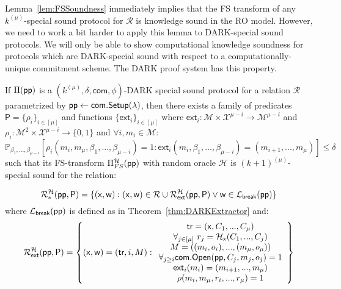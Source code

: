 Lemma~\ref{lem:FSSoundness} immediately implies that the FS transform of any $k^{(\mu)}$-special sound protocol for $\mathcal{R}$ is knowledge sound in the RO model. However, we need to work a bit harder to apply this lemma to DARK-special sound protocols. We will only be able to show computational knowledge soundness for protocols which are DARK-special sound with respect to a computationally-unique commitment scheme. The DARK proof system has this property. 
\begin{lemma} \label{lem:RODARKSpecial}
If $\Pi(\textsf{pp})$ is a $(k^{(\mu)}, \delta, \textsf{com} , \phi)$-DARK special sound protocol for a relation $\mathcal{R}$ parametrized by $\textsf{pp} \gets \textsf{com}.\textsf{{Setup}}(\lambda)$, then there exists a family of predicates $\textsf{P} = \{\rho_i\}_{i \in [\mu]}$ and functions $\{ \textsf{ext}_i\}_{i \in [\mu]}$ where $\textsf{ext}_i: \mathcal{M} \times \mathcal{X}^{\mu - i} \rightarrow \mathcal{M}^{\mu - i}$ and $\rho_i: \mathcal{M}^2 \times \mathcal{X}^{\mu - i} \rightarrow \{0,1\}$ and $\forall i, m_i \in \mathcal{M}$: 
$$\mathbb{P}_{\beta_1,...,\beta_{\mu - i}}[\rho_i(m_i, m_\mu, \beta_1,...,\beta_{\mu - i}) = 1: \textsf{ext}_i(m_i, \beta_1,...,\beta_{\mu - i}) = (m_{i+1},...,m_\mu)] \leq \delta $$
   such that its FS-transform $\Pi^{\mathcal{H}}_{FS}(\textsf{pp})$ with random oracle $\mathcal{H}$ is $(k+1)^{(\mu)}$-special sound for the relation: 

$$\mathcal{R}^\mathcal{H}_*(\textsf{pp}, \textsf{P}) = \{ (\mathsf{x}, \mathsf{w}): (\mathsf{x}, \mathsf{w}) \in \mathcal{R} \cup \mathcal{R}^{\mathcal{H}}_\textsf{ext}(\textsf{pp}, \textsf{P}) \vee \mathsf{w} \in \mathcal{L}_\textsf{break}(\textsf{pp}) \} $$ 	
where $\mathcal{L}_\textsf{break}(\textsf{pp})$ is defined as in Theorem~\ref{thm:DARKExtractor} and:
$$\mathcal{R}^{\mathcal{H}}_\textsf{ext}(\textsf{pp}, \textsf{P}) = \left\{(\mathsf{x}, \mathsf{w}) = (\textsf{{tr}}, i, M): \begin{array}{c} \textsf{{tr}} = (\mathsf{x}, C_1,...,C_\mu) \\ \forall_{j \in [\mu]} \ r_j = \mathcal{H}_\mathsf{x}(C_1,...,C_j) \\ M = ((m_i,o_i),...,(m_\mu, o_\mu)) \\ \forall_{j \geq i} \textsf{com}.\textsf{{Open}}(\textsf{pp},C_j, m_j, o_j) = 1 \\ \textsf{ext}_i(m_i) = (m_{i+1},...,m_\mu) \\ \rho(m_i, m_\mu, r_i,...,r_\mu) = 1  \end{array} \right\} $$ 

\end{lemma}
\fi 

